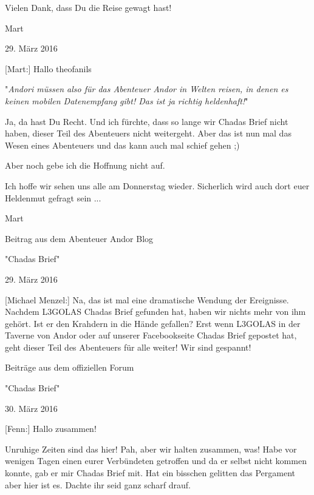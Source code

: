 \documentclass[10pt, a4paper, oneside]{book}
\begin{document}
\begin{multicols}{2}
Vielen Dank, dass Du die Reise gewagt hast!

Mart


\begin{center}
    29. März 2016
\end{center}




[Mart:] Hallo theofanils

"\textit{Andori müssen also für das Abenteuer Andor in Welten reisen, in denen es keinen mobilen Datenempfang gibt! Das ist ja richtig heldenhaft!}"

Ja, da hast Du Recht. Und ich fürchte, dass so lange wir Chadas Brief nicht haben, dieser Teil des Abenteuers nicht weitergeht. Aber das ist nun mal das Wesen eines Abenteuers und das kann auch mal schief gehen ;)

Aber noch gebe ich die Hoffnung nicht auf.

Ich hoffe wir sehen uns alle am Donnerstag wieder. Sicherlich wird auch dort euer Heldenmut gefragt sein ...

Mart



\begin{center}
    Beitrag aus dem Abenteuer Andor Blog

    "Chadas Brief" 

    29. März 2016
\end{center}


[Michael Menzel:] Na, das ist mal eine dramatische Wendung der Ereignisse. Nachdem L3GOLAS Chadas Brief gefunden hat, haben wir nichts mehr von ihm gehört. Ist er den Krahdern in die Hände gefallen? Erst wenn L3GOLAS in der Taverne von Andor oder auf unserer Facebookseite Chadas Brief gepostet hat, geht dieser Teil des Abenteuers für alle weiter! Wir sind gespannt!


\begin{center}
    Beiträge aus dem offiziellen Forum

    "Chadas Brief"

    30. März 2016
\end{center}



[Fenn:] Hallo zusammen!

Unruhige Zeiten sind das hier! Pah, aber wir halten zusammen, was! Habe vor wenigen Tagen einen eurer Verbündeten getroffen und da er selbst nicht kommen konnte, gab er mir Chadas Brief mit. Hat ein bisschen gelitten das Pergament aber hier ist es. Dachte ihr seid ganz scharf drauf.


\end{multicols}
\end{document}
